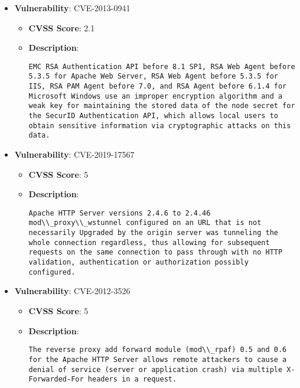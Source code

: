 \documentclass{article}
\begin{document}
\begin{itemize}
        \item \textbf{Vulnerability}: CVE-2013-0941
        \begin{itemize}
            \item \textbf{CVSS Score}:  2.1 
            \item \textbf{Description}:
            \parbox[t]{0.9\linewidth}{
                \verb|EMC RSA Authentication API before 8.1 SP1, RSA Web Agent before 5.3.5 for Apache Web Server, RSA Web Agent before 5.3.5 for IIS, RSA PAM Agent before 7.0, and RSA Agent before 6.1.4 for Microsoft Windows use an improper encryption algorithm and a weak key for maintaining the stored data of the node secret for the SecurID Authentication API, which allows local users to obtain sensitive information via cryptographic attacks on this data.|
            }
        \end{itemize}
    
        \item \textbf{Vulnerability}: CVE-2019-17567
        \begin{itemize}
            \item \textbf{CVSS Score}:  5 
            \item \textbf{Description}:
            \parbox[t]{0.9\linewidth}{
                \verb|Apache HTTP Server versions 2.4.6 to 2.4.46 mod\\_proxy\\_wstunnel configured on an URL that is not necessarily Upgraded by the origin server was tunneling the whole connection regardless, thus allowing for subsequent requests on the same connection to pass through with no HTTP validation, authentication or authorization possibly configured.|
            }
        \end{itemize}
    
        \item \textbf{Vulnerability}: CVE-2012-3526
        \begin{itemize}
            \item \textbf{CVSS Score}:  5 
            \item \textbf{Description}:
            \parbox[t]{0.9\linewidth}{
                \verb|The reverse proxy add forward module (mod\\_rpaf) 0.5 and 0.6 for the Apache HTTP Server allows remote attackers to cause a denial of service (server or application crash) via multiple X-Forwarded-For headers in a request.|
            }
        \end{itemize}
    

\end{itemize}
\end{document}
